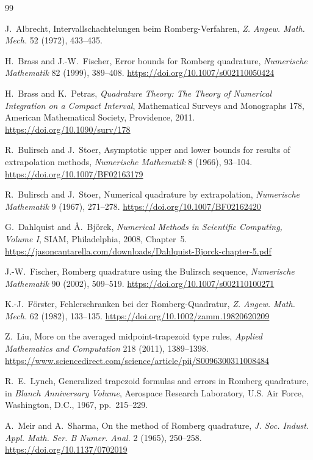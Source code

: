 \documentclass[11pt]{article}
\theoremstyle{definition}
\theoremstyle{remark}
\newcommand{\1}{\mathbf{1}}
\begin{document}
\begin{thebibliography}{99}

J.~Albrecht,
Intervallschachtelungen beim Romberg-Verfahren,
\emph{Z. Angew. Math. Mech.} 52 (1972), 433--435.

H.~Brass and J.-W.~Fischer,
Error bounds for Romberg quadrature,
\emph{Numerische Mathematik} 82 (1999), 389--408.
\url{https://doi.org/10.1007/s002110050424}

H.~Brass and K.~Petras,
\emph{Quadrature Theory: The Theory of Numerical Integration on a Compact
Interval}, Mathematical Surveys and Monographs 178,
American Mathematical Society, Providence, 2011.
\url{https://doi.org/10.1090/surv/178}

R.~Bulirsch and J.~Stoer,
Asymptotic upper and lower bounds for results of extrapolation methods,
\emph{Numerische Mathematik} 8 (1966), 93--104.
\url{https://doi.org/10.1007/BF02163179}

R.~Bulirsch and J.~Stoer,
Numerical quadrature by extrapolation,
\emph{Numerische Mathematik} 9 (1967), 271--278.
\url{https://doi.org/10.1007/BF02162420}

G.~Dahlquist and \AA.~Bj\"orck,
\emph{Numerical Methods in Scientific Computing, Volume I},
SIAM, Philadelphia, 2008, Chapter~5.
\url{https://jasoncantarella.com/downloads/Dahlquist-Bjorck-chapter-5.pdf}

J.-W.~Fischer,
Romberg quadrature using the Bulirsch sequence,
\emph{Numerische Mathematik} 90 (2002), 509--519.
\url{https://doi.org/10.1007/s002110100271}

K.-J.~F\"orster,
Fehlerschranken bei der Romberg-Quadratur,
\emph{Z. Angew. Math. Mech.} 62 (1982), 133--135.
\url{https://doi.org/10.1002/zamm.19820620209}

Z.~Liu,
More on the averaged midpoint-trapezoid type rules,
\emph{Applied Mathematics and Computation} 218 (2011), 1389--1398.
\url{https://www.sciencedirect.com/science/article/pii/S0096300311008484}

R.~E.~Lynch,
Generalized trapezoid formulas and errors in Romberg quadrature,
in \emph{Blanch Anniversary Volume}, Aerospace Research Laboratory,
U.S. Air Force, Washington, D.C., 1967, pp.~215--229.

A.~Meir and A.~Sharma,
On the method of Romberg quadrature,
\emph{J. Soc. Indust. Appl. Math. Ser. B Numer. Anal.} 2 (1965), 250--258.
\url{https://doi.org/10.1137/0702019}


\end{thebibliography}
\end{document}
